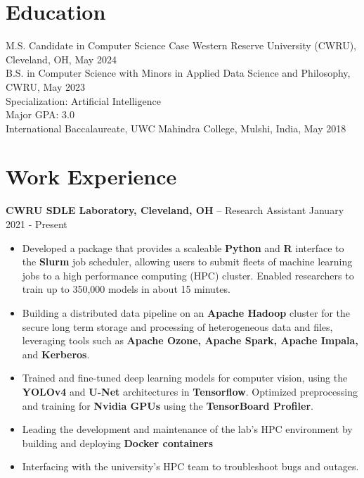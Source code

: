 \documentclass{res}
\begin{document}
 
	\renewcommand{\namefont}{\bfseries\LARGE}
	\renewcommand{\sectionfont}{\bfseries\Large}
	
 
 
\address{ +91 9059059687 \\  rounak@case.edu}
\address{\hfill \href{https://github.com/theroshogolla}{Github: theroshoglla} \\ \hfill \href{https://www.linkedin.com/in/rounakchawla}{LinkedIn: rounakchawla}}
 
\begin{resume} 
 
\section{Education} 
M.S. Candidate in Computer Science Case Western Reserve University (CWRU), Cleveland, OH, May 2024 \\
B.S. in Computer Science with Minors in Applied Data Science and Philosophy, CWRU, May 2023 \\
Specialization: Artificial Intelligence \\
Major GPA: 3.0 \\
International Baccalaureate, UWC Mahindra College, Mulshi, India,  May 2018

\section{Work Experience} 

{\large{\bf CWRU SDLE Laboratory, Cleveland, OH} – Research Assistant \hfill January 2021 - Present}
\begin{itemize} \itemsep -2pt
	\item Developed a package that provides a scaleable \textbf{Python} and \textbf{R} interface to the \textbf{Slurm} job scheduler, allowing users to submit fleets of machine learning jobs to a high performance computing (HPC) cluster. Enabled researchers to train up to 350,000 models in about 15 minutes.
	\item Building a distributed data pipeline on an \textbf{Apache Hadoop} cluster for the secure long term storage and processing of heterogeneous data and files, leveraging tools such as \textbf{Apache Ozone, Apache Spark, Apache Impala,} and \textbf{Kerberos}.
	\item Trained and fine-tuned deep learning models for computer vision, using the \textbf{YOLOv4} and \textbf{U-Net} architectures in \textbf{Tensorflow}. Optimized preprocessing and training for \textbf{Nvidia GPUs} using the \textbf{TensorBoard Profiler}.
	\item Leading the development and maintenance of the lab's HPC environment by building and deploying \textbf{Docker containers}
	\item Interfacing with the university's HPC team to troubleshoot bugs and outages.
\end{itemize}



\end{resume}
\end{document}
